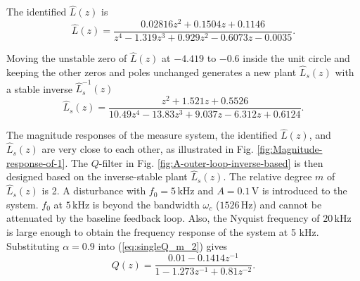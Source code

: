 \documentclass [11pt, proquest] {uwthesis}[2020/02/24]
\begin{document}
The identified $\hat{L}(z)$ is
\begin{equation}
\hat{L}(z)=\frac{0.02816z^{2}+0.1504z+0.1146}{z^{4}-1.319z^{3}+0.929z^{2}-0.6073z-0.0035}.\label{eq:integrated_L}
\end{equation}

Moving the unstable zero of $\hat{L}(z)$ at $-4.419$ to $-0.6$
inside the unit circle and keeping the other zeros and poles unchanged
generates a new plant $\hat{L}_{s}(z)$ with a stable inverse $\hat{L}_{s}^{-1}(z)$
\begin{equation}
\hat{L}_{s}(z)=\frac{z^{2}+1.521z+0.5526}{10.49z^{4}-13.83z^{3}+9.037z-6.312z+0.6124}.\label{eq:integrated_L_stable}
\end{equation}

The magnitude responses of the measure system, the identified $\hat{L}(z)$,
and $\hat{L}_{s}(z)$ are very close to each other, as illustrated
in Fig. \ref{fig:Magnitude-response-of-1}. The $Q$-filter in Fig.
\ref{fig:A-outer-loop-inverse-based} is then designed based on the
inverse-stable plant $\hat{L}_{s}(z)$. The relative degree $m$ of
$\hat{L}_{s}(z)$ is 2. A disturbance with $f_{0}=5\,\text{kHz}$
and $A=0.1\,\text{V}$ is introduced to the system. $f_{0}$ at $5\,\text{kHz}$
is beyond the bandwidth $\omega_{c}$ ($1526\,\text{Hz}$) and cannot
be attenuated by the baseline feedback loop. Also, the Nyquist frequency
of $20\,\text{kHz}$ is large enough to obtain the frequency response
of the system at 5 kHz. Substituting $\alpha=0.9$ into (\ref{eq:singleQ_m_2})
gives
\begin{equation}
Q(z)=\frac{0.01-0.1414z^{-1}}{1-1.273z^{-1}+0.81z^{-2}}.\label{eq:singleQ_L}
\end{equation}
\end{document}
